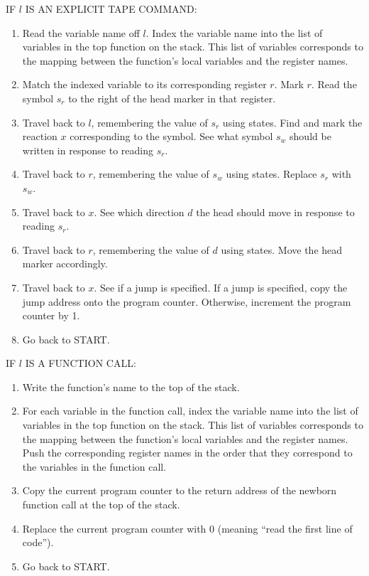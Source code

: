 \documentclass[11pt]{article}
\begin{document}
\noindent IF $l$ IS AN EXPLICIT TAPE COMMAND:
\begin{enumerate}
\item Read the variable name off $l$. Index the variable name into the list of variables in the top function on the stack. This list of variables corresponds to the mapping between the function's local variables and the register names.
\item Match the indexed variable to its corresponding register $r$. Mark $r$. Read the symbol $s_r$ to the right of the head marker in that register.
\item Travel back to $l$, remembering the value of $s_r$ using states. Find and mark the reaction $x$ corresponding to the symbol. See what symbol $s_w$ should be written in response to reading $s_r$.
\item Travel back to $r$, remembering the value of $s_w$ using states. Replace $s_r$ with $s_w$.
\item Travel back to $x$. See which direction $d$ the head should move in response to reading $s_r$.
\item Travel back to $r$, remembering the value of $d$ using states. Move the head marker accordingly.
\item Travel back to $x$. See if a jump is specified. If a jump is specified, copy the jump address onto the program counter. Otherwise, increment the program counter by 1.
\item Go back to START.
\end{enumerate}

\noindent IF $l$ IS A FUNCTION CALL:
\begin{enumerate}
\item Write the function's name to the top of the stack.
\item For each variable in the function call, index the variable name into the list of variables in the top function on the stack. This list of variables corresponds to the mapping between the function's local variables and the register names. Push the corresponding register names in the order that they correspond to the variables in the function call.
\item Copy the current program counter to the return address of the newborn function call at the top of the stack.
\item Replace the current program counter with 0 (meaning ``read the first line of code'').
\item Go back to START.
\end{enumerate}
\end{document}
